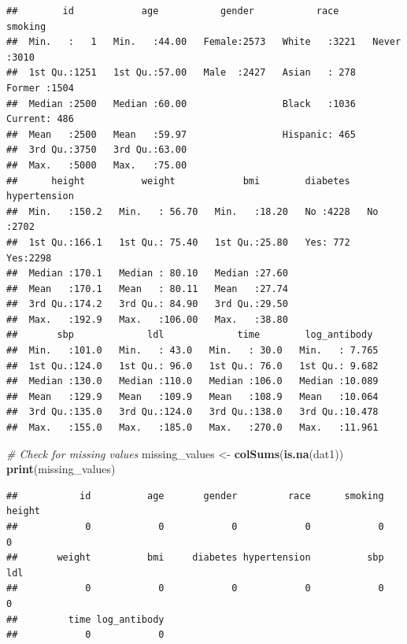 \documentclass[
]{article}
\newenvironment{Shaded}{\begin{snugshade}}{\end{snugshade}}
\newcommand{\CommentTok}[1]{\textcolor[rgb]{0.56,0.35,0.01}{\textit{#1}}}
\newcommand{\FunctionTok}[1]{\textcolor[rgb]{0.13,0.29,0.53}{\textbf{#1}}}
\newcommand{\NormalTok}[1]{#1}
\newcommand{\OtherTok}[1]{\textcolor[rgb]{0.56,0.35,0.01}{#1}}
\begin{document}
\begin{verbatim}
##        id            age           gender           race         smoking    
##  Min.   :   1   Min.   :44.00   Female:2573   White   :3221   Never  :3010  
##  1st Qu.:1251   1st Qu.:57.00   Male  :2427   Asian   : 278   Former :1504  
##  Median :2500   Median :60.00                 Black   :1036   Current: 486  
##  Mean   :2500   Mean   :59.97                 Hispanic: 465                 
##  3rd Qu.:3750   3rd Qu.:63.00                                               
##  Max.   :5000   Max.   :75.00                                               
##      height          weight            bmi        diabetes   hypertension
##  Min.   :150.2   Min.   : 56.70   Min.   :18.20   No :4228   No :2702    
##  1st Qu.:166.1   1st Qu.: 75.40   1st Qu.:25.80   Yes: 772   Yes:2298    
##  Median :170.1   Median : 80.10   Median :27.60                          
##  Mean   :170.1   Mean   : 80.11   Mean   :27.74                          
##  3rd Qu.:174.2   3rd Qu.: 84.90   3rd Qu.:29.50                          
##  Max.   :192.9   Max.   :106.00   Max.   :38.80                          
##       sbp             ldl             time        log_antibody   
##  Min.   :101.0   Min.   : 43.0   Min.   : 30.0   Min.   : 7.765  
##  1st Qu.:124.0   1st Qu.: 96.0   1st Qu.: 76.0   1st Qu.: 9.682  
##  Median :130.0   Median :110.0   Median :106.0   Median :10.089  
##  Mean   :129.9   Mean   :109.9   Mean   :108.9   Mean   :10.064  
##  3rd Qu.:135.0   3rd Qu.:124.0   3rd Qu.:138.0   3rd Qu.:10.478  
##  Max.   :155.0   Max.   :185.0   Max.   :270.0   Max.   :11.961
\end{verbatim}

\begin{Shaded}
\begin{Highlighting}[]
\CommentTok{\# Check for missing values}
\NormalTok{missing\_values }\OtherTok{\textless{}{-}} \FunctionTok{colSums}\NormalTok{(}\FunctionTok{is.na}\NormalTok{(dat1))}
\FunctionTok{print}\NormalTok{(missing\_values)}
\end{Highlighting}
\end{Shaded}

\begin{verbatim}
##           id          age       gender         race      smoking       height 
##            0            0            0            0            0            0 
##       weight          bmi     diabetes hypertension          sbp          ldl 
##            0            0            0            0            0            0 
##         time log_antibody 
##            0            0
\end{verbatim}
\end{document}
